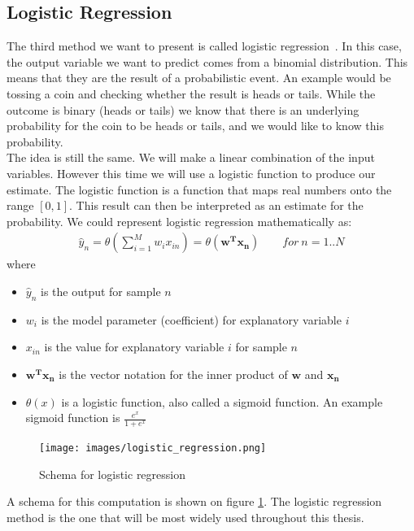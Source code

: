 \subsection{Logistic Regression}
\label{subsec:glm-logistic-regression}
The third method we want to present is called logistic regression~\cite{caltechmachinelearning}\cite{wikilogistic}. In this case, the output variable we want to predict comes from a binomial distribution. This means that they are the result of a probabilistic event. An example would be tossing a coin and checking whether the result is heads or tails. While the outcome is binary (heads or tails) we know that there is an underlying probability for the coin to be heads or tails, and we would like to know this probability. \\

The idea is still the same. We will make a linear combination of the input variables. However this time we will use a logistic function to produce our estimate. The logistic function is a function that maps real numbers onto the range $[0,1]$. This result can then be interpreted as an estimate for the probability. We could represent logistic regression mathematically as:
\begin{equation}
\label{eq:glm-logistic-regression}
\begin{split}
\hat{y}_{n} = \theta(\sum_{i=1}^{M}w_{i}x_{in})= \theta(\bm{w^{T}x_{n}}) \qquad for\ n=1..N
\end{split}
\end{equation}
where
\begin{itemize}
	\item $\hat{y}_{n}$ is the output for sample $n$
	\item $w_{i}$ is the model parameter (coefficient) for explanatory variable $i$
	\item $x_{in}$ is the value for explanatory variable $i$ for sample $n$
	\item $\bm{w^{T}x_{n}}$ is the vector notation for the inner product of $\bm{w}$ and $\bm{x_{n}}$
	\item $\theta(x)$ is a logistic function, also called a sigmoid function. An example sigmoid function is $\frac{e^{x}}{1+e^{x}}$
\end{itemize}
\begin{figure}
	\centering
	\texttt{[image: images/logistic\_regression.png]}
	\caption{Schema for logistic regression}
	\label{fig:glm-logistic-regression}
\end{figure}
A schema for this computation is shown on figure \ref{fig:glm-logistic-regression}.
The logistic regression method is the one that will be most widely used throughout this thesis.

